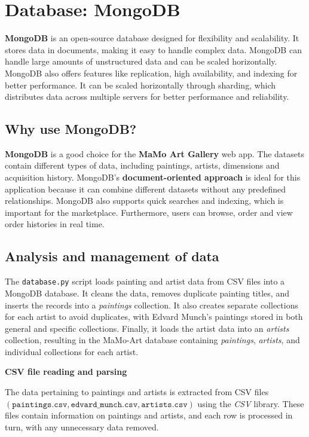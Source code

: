 \documentclass[a4paper,12pt]{article}
\begin{document}
\newpage
\section{Database: MongoDB}
\justify

\textbf{MongoDB} is an open-source database designed for flexibility and scalability. It stores data in documents, making it easy to handle complex data. MongoDB can handle large amounts of unstructured data and can be scaled horizontally. MongoDB also offers features like replication, high availability, and indexing for better performance. It can be scaled horizontally through sharding, which distributes data across multiple servers for better performance and reliability.


\subsection{Why use MongoDB?}
\justify
\textbf{MongoDB} is a good choice for the \textbf{MaMo Art Gallery} web app. The datasets contain different types of data, including paintings, artists, dimensions and acquisition history. MongoDB's \textbf{document-oriented approach} is ideal for this application because it can combine different datasets without any predefined relationships. MongoDB also supports quick searches and indexing, which is important for the marketplace. Furthermore, users can browse, order and view order histories in real time.

\subsection{Analysis and management of data}
\justify

The \texttt{database.py} script loads painting and artist data from CSV files into a MongoDB database. It cleans the data, removes duplicate painting titles, and inserts the records into a \textit{paintings} collection. It also creates separate collections for each artist to avoid duplicates, with Edvard Munch's paintings stored in both general and specific collections. Finally, it loads the artist data into an \textit{artists} collection, resulting in the MaMo-Art database containing \textit{paintings}, \textit{artists}, and individual collections for each artist.

\textbf{CSV file reading and parsing}

The data pertaining to paintings and artists is extracted from CSV files $\left(\texttt{paintings.csv}, \texttt{edvard\_munch.csv}, \texttt{artists.csv}\right)$ using the \textit{CSV} library. These files contain information on paintings and artists, and each row is processed in turn, with any unnecessary data removed.
\end{document}
